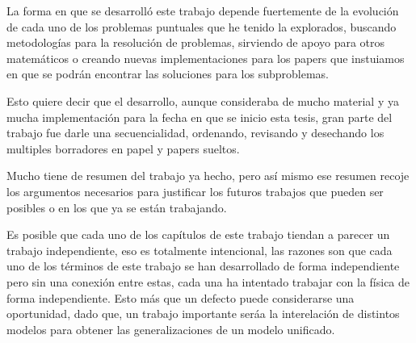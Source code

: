 La forma en que se desarrolló este trabajo depende fuertemente de la
evolución de cada uno de los problemas puntuales que he tenido la
explorados, buscando metodologías para la resolución de problemas,
sirviendo de apoyo para otros matemáticos o creando nuevas
implementaciones para los papers que instuiamos en que se podrán
encontrar las soluciones para los subproblemas.

Esto quiere decir que el desarrollo, aunque consideraba de mucho
material y ya mucha implementación para la fecha en que se inicio esta
tesis, gran parte del trabajo fue darle una secuencialidad, ordenando,
revisando y desechando los multiples borradores en papel y papers
sueltos.

Mucho tiene de resumen del trabajo ya hecho, pero así mismo ese
resumen recoje los argumentos necesarios para justificar los futuros
trabajos que pueden ser posibles o en los que ya se están trabajando.

Es posible que cada uno de los capítulos de este trabajo tiendan a
parecer un trabajo independiente, eso es totalmente intencional, las
razones son que cada uno de los términos de este trabajo se han
desarrollado de forma independiente pero sin una conexión entre estas,
cada una ha intentado trabajar con la física de forma
independiente. Esto más que un defecto puede considerarse una
oportunidad, dado que, un trabajo importante seráa la interelación de
distintos modelos para obtener las generalizaciones de un modelo
unificado.


